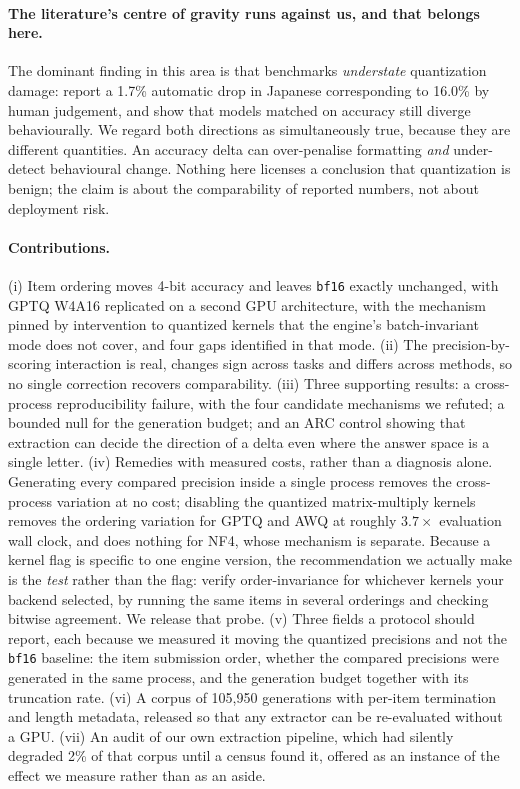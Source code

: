 \documentclass[11pt]{article}
\begin{document}
\paragraph{The literature's centre of gravity runs against us, and that belongs here.}
The dominant finding in this area is that benchmarks \emph{understate}
quantization damage: \citet{marchisio2024multilingual} report a 1.7\% automatic
drop in Japanese corresponding to 16.0\% by human judgement, and
\citet{dutta2024accuracy} show that models matched on accuracy still diverge
behaviourally. We regard both directions as simultaneously true, because they are
different quantities. An accuracy delta can over-penalise formatting
\emph{and} under-detect behavioural change. Nothing here licenses a conclusion
that quantization is benign; the claim is about the comparability of reported
numbers, not about deployment risk.

\paragraph{Contributions.}
(i) Item ordering moves 4-bit accuracy and leaves \texttt{bf16} exactly unchanged, with
GPTQ W4A16 replicated on a second GPU architecture, with the mechanism pinned by intervention to quantized kernels that the
engine's batch-invariant mode does not cover, and four gaps identified in that mode.
(ii) The precision-by-scoring interaction is real, changes sign across tasks and differs
across methods, so no single correction recovers comparability.
(iii) Three supporting results: a cross-process reproducibility failure, with the four
candidate mechanisms we refuted; a bounded null for the generation budget; and an ARC
control showing that extraction can decide the direction of a delta even where the answer
space is a single letter.
(iv) Remedies with measured costs, rather than a diagnosis alone. Generating every
compared precision inside a single process removes the cross-process variation at no
cost; disabling the quantized matrix-multiply kernels removes the ordering variation for
GPTQ and AWQ at roughly $3.7\times$ evaluation wall clock, and does nothing for NF4,
whose mechanism is separate. Because a kernel flag is specific to one engine version, the
recommendation we actually make is the \emph{test} rather than the flag: verify
order-invariance for whichever kernels your backend selected, by running the same items
in several orderings and checking bitwise agreement. We release that probe.
(v) Three fields a protocol should report, each because we measured it moving the
quantized precisions and not the \texttt{bf16} baseline: the item submission order, whether
the compared precisions were generated in the same process, and the generation budget
together with its truncation rate.
(vi) A corpus of 105{,}950 generations with per-item termination and length
metadata, released so that any extractor can be re-evaluated without a GPU.
(vii) An audit of our own extraction pipeline, which had silently degraded 2\% of
that corpus until a census found it, offered as an instance of the effect we
measure rather than as an aside.
\end{document}
